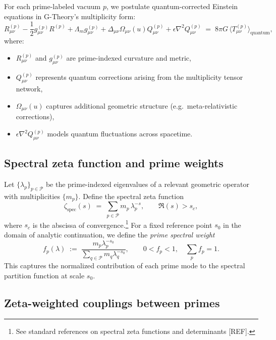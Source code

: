 \documentclass[11pt]{article}
\begin{document}
For each prime-labeled vacuum \(p\), we postulate quantum-corrected Einstein equations in G-Theory's multiplicity form:
\begin{equation}
  R_{\mu\nu}^{(p)} - \frac{1}{2} g_{\mu\nu}^{(p)} R^{(p)}
  + \Lambda_m g_{\mu\nu}^{(p)}
  + \Delta_{\mu\nu} \Omega_{\mu\nu}(u) Q_{\mu\nu}^{(p)}
  + \epsilon \nabla^2 Q_{\mu\nu}^{(p)}
  \;=\;
  8\pi G \, \langle T_{\mu\nu}^{(p)} \rangle_{\text{quantum}},
\end{equation}
where:
\begin{itemize}
  \item \(R_{\mu\nu}^{(p)}\) and \(g_{\mu\nu}^{(p)}\) are prime-indexed curvature and metric,
  \item \(Q_{\mu\nu}^{(p)}\) represents quantum corrections arising from the multiplicity tensor network,
  \item \(\Omega_{\mu\nu}(u)\) captures additional geometric structure (e.g.\ meta-relativistic corrections),
  \item \(\epsilon \nabla^2 Q_{\mu\nu}^{(p)}\) models quantum fluctuations across spacetime.
\end{itemize}

\subsection{Spectral zeta function and prime weights}

Let \(\{\lambda_p\}_{p \in \mathcal{P}}\) be the prime-indexed eigenvalues of a relevant geometric operator with multiplicities \(\{m_p\}\).
Define the spectral zeta function
\begin{equation}
  \zeta_{\mathrm{spec}}(s)
  \;=\;
  \sum_{p\in\mathcal{P}} m_p\, \lambda_p^{-s},
  \qquad \Re(s) > s_c,
\end{equation}
where \(s_c\) is the abscissa of convergence.\footnote{See standard references on spectral zeta functions and determinants [REF].}
For a fixed reference point \(s_0\) in the domain of analytic continuation, we define the \emph{prime spectral weight}
\begin{equation}
  f_p(\lambda)
  \;:=\;
  \frac{m_p \lambda_p^{-s_0}}{\displaystyle\sum_{q\in\mathcal{P}} m_q \lambda_q^{-s_0}},
  \qquad
  0 < f_p < 1,\quad
  \sum_p f_p = 1.
\end{equation}
This captures the normalized contribution of each prime mode to the spectral partition function at scale \(s_0\).

\subsection{Zeta-weighted couplings between primes}
\end{document}
